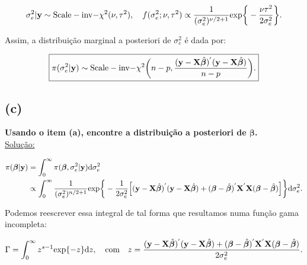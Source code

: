\documentclass[12pt, oldfontcommands]{article}\usepackage[]{graphicx}\usepackage[]{color}
\begin{document}
\[ \sigma_{e}^{2}|\mathbf{y} \sim
   {\rm Scale-inv-}\chi^{2} (\nu, \tau^{2}), \quad
   f(\sigma_{e}^{2}; \nu, \tau^{2}) \propto
   \frac{1}{(\sigma_{e}^{2})^{\nu/2 + 1}}
   {\rm exp}\bigg\{-\frac{\nu \tau^{2}}{2\sigma_{e}^{2}}\bigg\}. \]

Assim, a distribuição marginal a posteriori de \(\sigma_{e}^{2}\) é dada
por:

\[
\boxed{\pi(\sigma_{e}^{2}|\mathbf{y}) \sim {\rm Scale-inv-}\chi^{2}
       \bigg(n - p, \frac{(\mathbf{y} - \mathbf{X} \hat{\bm{\beta}})^{'}
            (\mathbf{y} - \mathbf{X} \hat{\bm{\beta}})
             }{n - p}\bigg).} \]

\subsection*{(c)} 

\textbf{Usando o item (a), encontre a distribuição a posteriori de
        \(\bm{\beta}\).} \\
        
\underline{Solução:}

\begin{align*}
 \pi(\bm{\beta}|\mathbf{y}) & =
 \int_{0}^{\infty} \pi(\bm{\beta}, \sigma_{e}^{2}|\mathbf{y})
 {\rm d}\sigma_{e}^{2} \\ & \propto \int_{0}^{\infty}
 \frac{1}{(\sigma_{e}^{2})^{n/2 + 1}}
 {\rm exp}\bigg\{-\frac{1}{2\sigma_{e}^{2}}
 \Big[(\mathbf{y} - \mathbf{X} \hat{\bm{\beta}})^{'}
 (\mathbf{y} - \mathbf{X} \hat{\bm{\beta}})
 + (\bm{\beta} - \hat{\bm{\beta}})^{'}
 \mathbf{X}^{'}\mathbf{X}(\bm{\beta} - \hat{\bm{\beta}}) \Big]\bigg\}
 {\rm d}\sigma_{e}^{2}.
\end{align*}

Podemos reescrever essa integral de tal forma que resultamos numa
função gama incompleta:

\[ \Gamma = \int_{0}^{\infty} z^{s-1} {\rm exp}\{-z\} {\rm d} z, \quad
   {\rm com} \quad
   z = \frac{(\mathbf{y} - \mathbf{X} \hat{\bm{\beta}})^{'}
   (\mathbf{y} - \mathbf{X} \hat{\bm{\beta}})
   + (\bm{\beta} - \hat{\bm{\beta}})^{'}
   \mathbf{X}^{'}\mathbf{X}(\bm{\beta} -
   \hat{\bm{\beta}})}{2\sigma_{e}^{2}}. \]
\end{document}
